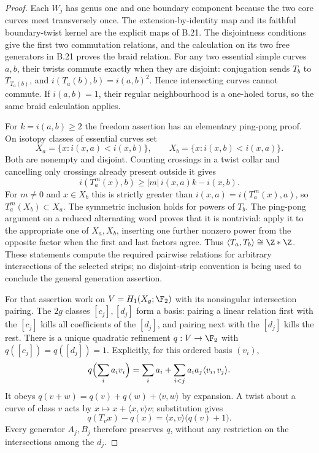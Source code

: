 \begin{proof}
Each $W_j$ has genus one and one boundary component because the two
core curves meet transversely once. The extension-by-identity map and
its faithful boundary-twist kernel are the explicit maps of B.21.
The disjointness conditions give the first two commutation relations,
and the calculation on its two free generators in B.21 proves the
braid relation. For any two essential simple curves $a,b$, their
twists commute exactly when they are disjoint: conjugation sends
$T_b$ to $T_{T_a(b)}$, and
$i(T_a(b),b)=i(a,b)^2$. Hence intersecting curves cannot commute.
If $i(a,b)=1$, their regular neighbourhood is a one-holed torus, so
the same braid calculation applies.

For $k=i(a,b)\ge2$ the freedom assertion has an elementary ping-pong
proof. On isotopy classes of essential curves set
\[
 X_a=\{x:i(x,a)<i(x,b)\},\qquad
 X_b=\{x:i(x,b)<i(x,a)\}.
\]
Both are nonempty and disjoint. Counting crossings in a twist collar
and cancelling only crossings already present outside it gives
\[
 i(T_a^m(x),b)\ge |m|\,i(x,a)k-i(x,b).
\]
For $m\ne0$ and $x\in X_b$ this is strictly greater than
$i(x,a)=i(T_a^m(x),a)$, so $T_a^m(X_b)\subset X_a$.
The symmetric inclusion holds for powers of $T_b$. The ping-pong
argument on a reduced alternating word proves that it is nontrivial:
apply it to the appropriate one of $X_a,X_b$, inserting one further
nonzero power from the opposite factor when the first and last
factors agree. Thus $\langle T_a,T_b\rangle\cong\Z*\Z$.
These statements compute the required pairwise relations for arbitrary
intersections of the selected strips; no disjoint-strip convention is
being used to conclude the general generation assertion.

For that assertion work on $V=H_1(X_g;\F_2)$ with its nonsingular
intersection pairing. The $2g$ classes $[c_j],[d_j]$ form a basis:
pairing a linear relation first with the $[c_j]$ kills all coefficients
of the $[d_j]$, and pairing next with the $[d_j]$ kills the rest.
There is a unique quadratic refinement $q:V\to\F_2$ with
$q([c_j])=q([d_j])=1$. Explicitly, for this ordered basis $(v_i)$,
\[
 q\Bigl(\sum_i a_iv_i\Bigr)
 =\sum_i a_i+\sum_{i<j}a_ia_j\langle v_i,v_j\rangle.
\]
It obeys $q(v+w)=q(v)+q(w)+\langle v,w\rangle$ by expansion.
A twist about a curve of class $v$ acts by
$x\mapsto x+\langle x,v\rangle v$; substitution gives
\[
 q(T_vx)-q(x)=\langle x,v\rangle\bigl(q(v)+1\bigr).
\]
Every generator $A_j,B_j$ therefore preserves $q$, without any
restriction on the intersections among the $d_j$.


\end{proof}
